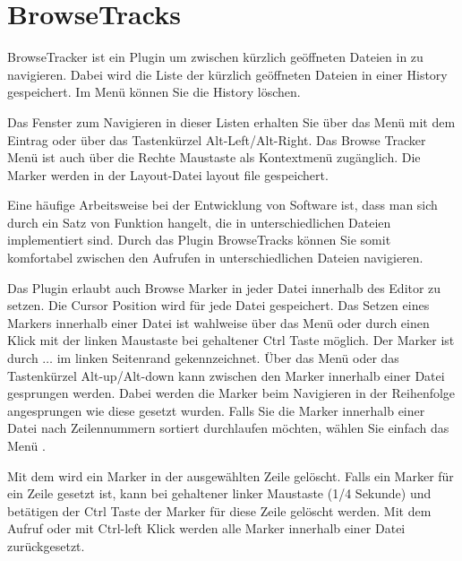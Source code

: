 \section{BrowseTracks}\label{sec:browsetracks}

BrowseTracker ist ein Plugin um zwischen kürzlich geöffneten Dateien in \codeblocks zu navigieren. Dabei wird die Liste der kürzlich geöffneten Dateien in einer History gespeichert. Im Menü  können Sie die History löschen.

Das Fenster  zum Navigieren in dieser Listen erhalten Sie über das Menü  mit dem Eintrag  oder über das Tastenkürzel Alt-Left/Alt-Right. Das Browse Tracker Menü ist auch über die Rechte Maustaste als Kontextmenü zugänglich. Die Marker werden in der Layout-Datei layout file  gespeichert.

Eine häufige Arbeitsweise bei der Entwicklung von Software ist, dass man sich durch ein Satz von Funktion hangelt, die in unterschiedlichen Dateien implementiert sind. Durch das Plugin BrowseTracks können Sie somit komfortabel zwischen den Aufrufen in unterschiedlichen Dateien navigieren.

Das Plugin erlaubt auch Browse Marker in jeder Datei innerhalb des \codeblocks Editor zu setzen. Die Cursor Position wird für jede Datei gespeichert. Das Setzen eines Markers innerhalb einer Datei ist wahlweise über das Menü  oder durch einen Klick mit der linken Maustaste bei gehaltener Ctrl Taste möglich. Der Marker ist durch $\ldots$ im linken Seitenrand gekennzeichnet. Über das Menü  oder das Tastenkürzel Alt-up/Alt-down kann zwischen den Marker innerhalb einer Datei gesprungen werden. Dabei werden die Marker beim Navigieren in der Reihenfolge angesprungen wie diese gesetzt wurden. Falls Sie die Marker innerhalb einer Datei nach Zeilennummern sortiert durchlaufen möchten, wählen Sie einfach das Menü .

Mit dem  wird ein Marker in der ausgewählten Zeile gelöscht. Falls ein Marker für ein Zeile gesetzt ist, kann bei gehaltener linker Maustaste (1/4 Sekunde) und betätigen der Ctrl Taste der Marker für diese Zeile gelöscht werden. Mit dem Aufruf  oder mit Ctrl-left Klick werden alle Marker innerhalb einer Datei zurückgesetzt.

